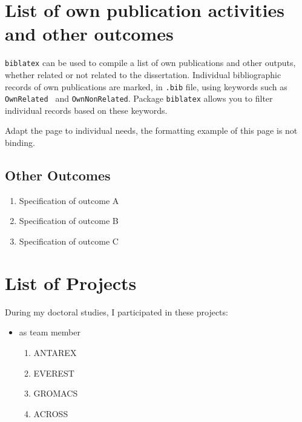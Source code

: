 \chapter*{List of own publication activities and other outcomes}
\label{sec:ListOfStudentsOwnPublicationActivitiesAndOtherOutcomes}
\verb|biblatex| can be used to compile a list of own publications and other outputs, whether related or not related to the dissertation. Individual bibliographic records of own publications are marked, in \verb|.bib| file, using keywords such as \verb|OwnRelated | and \verb|OwnNonRelated|. Package \verb|biblatex| allows you to filter individual records based on these keywords.

Adapt the page to individual needs, the formatting example of this page is not binding.

\begin{refsection}
\nocite{MyRelatedArticle1, MyRelatedArticle2}
\printbibliography[keyword={OwnRelated}, heading=subbibintoc, title={Publications and Outcomes Related to Thesis}]
\end{refsection}

\begin{refsection}
\nocite{MyNonrelatedArticle1}
\printbibliography[keyword={OwnNonRelated}, heading=subbibintoc, title={Publications and Outcomes Not Related to Thesis}]
\end{refsection}

\section*{Other Outcomes}
\begin{enumerate}
	\item Specification of outcome A
	\item Specification of outcome B
	\item Specification of outcome C
\end{enumerate}


\chapter*{List of Projects}
\label{sec:ListOfProjects}
During my doctoral studies, I participated in these projects:
\begin{itemize}
	\item as team member
		\begin{enumerate}
			\item ANTAREX
			\item EVEREST
			\item GROMACS
			\item ACROSS
		\end{enumerate}
\end{itemize}

\endinput
